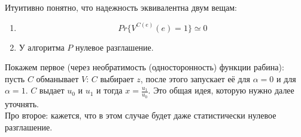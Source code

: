 \documentclass[a4paper]{article}
\theoremstyle{definition}
\theoremstyle{plain}
\begin{document}
\noindent Итуитивно понятно, что надежность эквивалентна двум вещам:
\begin{enumerate}
	\item
		$$
			Pr\{V^{C(e)}(e) = 1\} \simeq 0		
		$$
	\item У алгоритма $P$ нулевое разглашение.
\end{enumerate}

\noindent Покажем первое (через необратимость (односторонность) функции рабина):
пусть $C$ обманывает $V$: $C$ выбирает $z$, после этого запускает её для $\alpha = 0$ и для $\alpha = 1$.
$C$ выдает $u_0$ и $u_1$ и тогда $x = \frac{u_1}{u_0}$. Это общая идея, которую нужно далее уточнять.~\\

\noindent Про второе: кажется, что в этом случае будет даже статистически нулевое разглашение.
\end{document}
